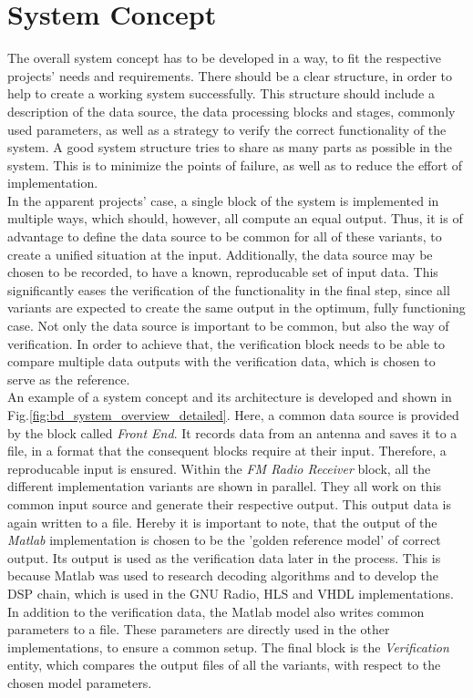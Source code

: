 \section{System Concept}

The overall system concept has to be developed in a way, to fit the respective projects' needs and requirements.
There should be a clear structure, in order to help to create a working system successfully.
This structure should include a description of the data source, the data processing blocks and stages, commonly used parameters, as well as a strategy to verify the correct functionality of the system.
A good system structure tries to share as many parts as possible in the system.
This is to minimize the points of failure, as well as to reduce the effort of implementation.\\

In the apparent projects' case, a single block of the system is implemented in multiple ways, which should, however, all compute an equal output.
Thus, it is of advantage to define the data source to be common for all of these variants, to create a unified situation at the input.
Additionally, the data source may be chosen to be recorded, to have a known, reproducable set of input data.
This significantly eases the verification of the functionality in the final step, since all variants are expected to create the same output in the optimum, fully functioning case.
Not only the data source is important to be common, but also the way of verification.
In order to achieve that, the verification block needs to be able to compare multiple data outputs with the verification data, which is chosen to serve as the reference.\\

An example of a system concept and its architecture is developed and shown in Fig.\ref{fig:bd_system_overview_detailed}.
Here, a common data source is provided by the block called \textit{Front End}.
It records data from an antenna and saves it to a file, in a format that the consequent blocks require at their input.
Therefore, a reproducable input is ensured.
Within the \textit{FM Radio Receiver} block, all the different implementation variants are shown in parallel.
They all work on this common input source and generate their respective output.
This output data is again written to a file.
Hereby it is important to note, that the output of the \textit{Matlab} implementation is chosen to be the 'golden reference model' of correct output.
Its output is used as the verification data later in the process.
This is because Matlab was used to research decoding algorithms and to develop the DSP chain, which is used in the GNU Radio, HLS and VHDL implementations.
In addition to the verification data, the Matlab model also writes common parameters to a file.
These parameters are directly used in the other implementations, to ensure a common setup.
The final block is the \textit{Verification} entity, which compares the output files of all the variants, with respect to the chosen model parameters.\\

